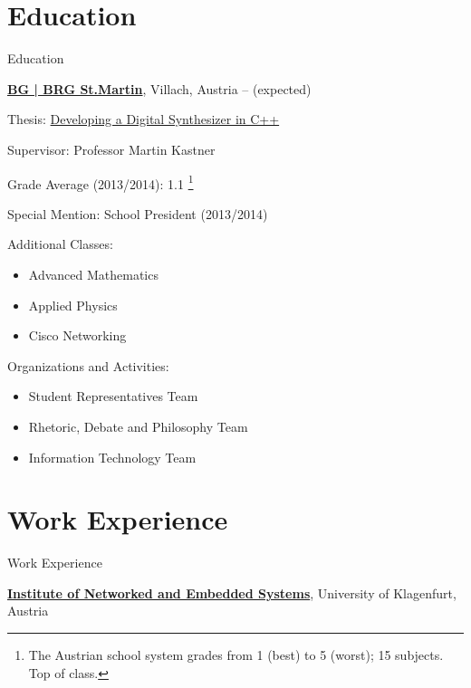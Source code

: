 \begin{body}


\section{Education}
{Education}

\href{http://it-gymnasium.at}
{\textbf{BG | BRG St.Martin}},
Villach, Austria
\hfill
{} --
 (expected)
\begin{detail}

Thesis:
\href{http://issuu.com/petergoldsborough/docs/thesis}
{Developing a Digital Synthesizer in C++}
\par
Supervisor: Professor Martin Kastner
\par
Grade Average (2013/2014):
1.1 \footnote{The Austrian school system grades from 1 (best) to 5 (worst); 15 subjects. Top of class.}
\par
Special Mention: School President (2013/2014)

\begin{multicols}{2}
Additional Classes:
\begin{itemize}
  \item Advanced Mathematics
  \item Applied Physics
  \item Cisco Networking
\end{itemize}

Organizations and Activities:
\begin{itemize}
  \item Student Representatives Team
  \item Rhetoric, Debate and Philosophy Team
  \item Information Technology Team
\end{itemize}
\end{multicols}
\end{detail}


\section{Work Experience}
{Work Experience}

\href{https://nes.aau.at}
{\textbf{Institute of Networked and Embedded Systems}},
University of Klagenfurt, Austria


\end{body}
